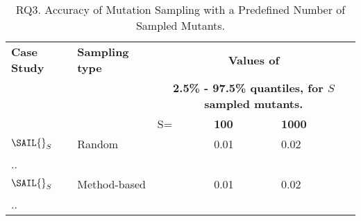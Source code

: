
\begin{table}[h]
\caption{RQ3. Accuracy of Mutation Sampling with a Predefined Number of Sampled Mutants.}
\label{table:results:fixedNumberOfMutants} 
\tiny
\begin{tabular}{|
p{15mm}p{15mm}
p{1mm}
p{1.5mm}p{1.5mm}
|}
\hline
\textbf{Case Study}&\textbf{Sampling type}&\multicolumn{3}{c|}{\textbf{Values of}}\\
&&\multicolumn{3}{c|}{\textbf{2.5\% - 97.5\% quantiles, for $S$ sampled mutants.}}\\ 
\hline
&&S=&\textbf{100}&\textbf{1000}
\\
$\mathit{\SAIL{}}_{S}$&Random
&&0.01&0.02
\\
..
\\
$\mathit{\SAIL{}}_{S}$&Method-based
&&0.01&0.02 
\\
..
\\
\end{tabular}

\end{table}
